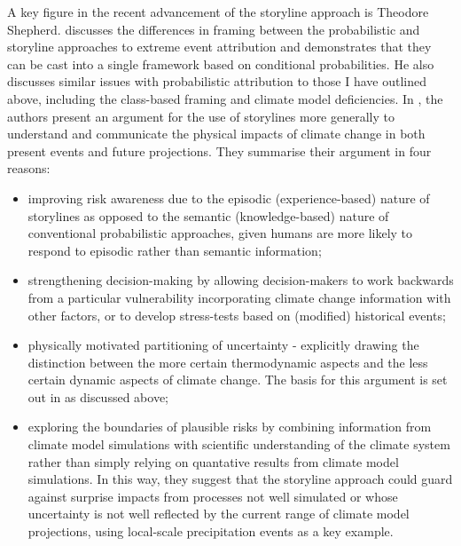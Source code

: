     A key figure in the recent advancement of the storyline approach is Theodore Shepherd. \citet{shepherd_common_2016} discusses the differences in framing between the probabilistic and storyline approaches to extreme event attribution and demonstrates that they can be cast into a single framework based on conditional probabilities. He also discusses similar issues with probabilistic attribution to those I have outlined above, including the class-based framing and climate model deficiencies. In \citet{shepherd_storylines_2018}, the authors present an argument for the use of storylines more generally to understand and communicate the physical impacts of climate change in both present events and future projections. They summarise their argument in four reasons: 
    \begin{itemize}
      \item improving risk awareness due to the episodic (experience-based) nature of storylines as opposed to the semantic (knowledge-based) nature of conventional probabilistic approaches, given humans are more likely to respond to episodic rather than semantic information;
      \item strengthening decision-making by allowing decision-makers to work backwards from a particular vulnerability incorporating climate change information with other factors, or to develop stress-tests based on (modified) historical events;
      \item physically motivated partitioning of uncertainty - explicitly drawing the distinction between the more certain thermodynamic aspects and the less certain dynamic aspects of climate change. The basis for this argument is set out in \citet{trenberth_attribution_2015} as discussed above;
      \item exploring the boundaries of plausible risks by combining information from climate model simulations with scientific understanding of the climate system rather than simply relying on quantative results from climate model simulations. In this way, they suggest that the storyline approach could guard against surprise impacts from processes not well simulated or whose uncertainty is not well reflected by the current range of climate model projections, using local-scale precipitation events as a key example.
    \end{itemize}

